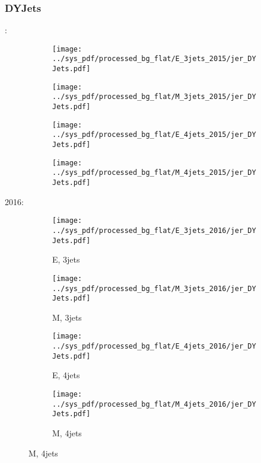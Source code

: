 \documentclass{beamer}
\begin{document}
\begin{frame}
\frametitle{DYJets}
\fontsize{5}{1}:
\begin{figure}
\centering
\begin{subfigure}[b]{0.24\textwidth}
\texttt{[image: ../sys\_pdf/processed\_bg\_flat/E\_3jets\_2015/jer\_DYJets.pdf]}
\end{subfigure}
\begin{subfigure}[b]{0.24\textwidth}
\texttt{[image: ../sys\_pdf/processed\_bg\_flat/M\_3jets\_2015/jer\_DYJets.pdf]}
\end{subfigure}
\begin{subfigure}[b]{0.24\textwidth}
\texttt{[image: ../sys\_pdf/processed\_bg\_flat/E\_4jets\_2015/jer\_DYJets.pdf]}
\end{subfigure}
\begin{subfigure}[b]{0.24\textwidth}
\texttt{[image: ../sys\_pdf/processed\_bg\_flat/M\_4jets\_2015/jer\_DYJets.pdf]}
\end{subfigure}
\end{figure}
2016:
\begin{figure}
\centering
\begin{subfigure}[b]{0.24\textwidth}
\texttt{[image: ../sys\_pdf/processed\_bg\_flat/E\_3jets\_2016/jer\_DYJets.pdf]}
\captionsetup{font=tiny}
\caption{E, 3jets}
\end{subfigure}
\begin{subfigure}[b]{0.24\textwidth}
\texttt{[image: ../sys\_pdf/processed\_bg\_flat/M\_3jets\_2016/jer\_DYJets.pdf]}
\captionsetup{font=tiny}
\caption{M, 3jets}
\end{subfigure}
\begin{subfigure}[b]{0.24\textwidth}
\texttt{[image: ../sys\_pdf/processed\_bg\_flat/E\_4jets\_2016/jer\_DYJets.pdf]}
\captionsetup{font=tiny}
\caption{E, 4jets}
\end{subfigure}
\begin{subfigure}[b]{0.24\textwidth}
\texttt{[image: ../sys\_pdf/processed\_bg\_flat/M\_4jets\_2016/jer\_DYJets.pdf]}
\captionsetup{font=tiny}
\caption{M, 4jets}
\end{subfigure}
\end{figure}
\end{frame}
\end{document}
